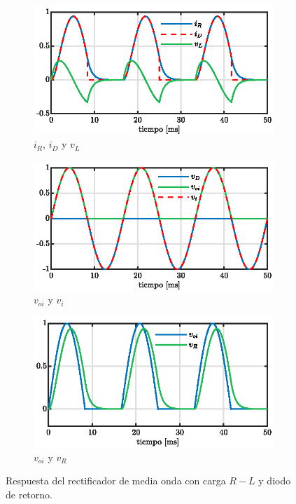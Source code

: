 \documentclass[conference]{IEEEtran}
\begin{document}
\begin{figure}[ht]
  \centering
  \begin{subfigure}[t]{0.5\textwidth}
    \centering
    \includegraphics[width=\linewidth]{figuras/ir_id_vl.eps}
    \caption{$i_R$, $i_D$ y $v_L$}
    \label{fig:ir-id-vl}
  \end{subfigure}\hfill
  \begin{subfigure}[t]{0.5\textwidth}
    \centering
    \includegraphics[width=\linewidth]{figuras/voi_vi.eps}
    \caption{$v_{oi}$ y $v_i$}
    \label{fig:voi-vi}
  \end{subfigure}\hfill
  \begin{subfigure}[t]{0.5\textwidth}
    \centering
    \includegraphics[width=\linewidth]{figuras/voi_vr.eps}
    \caption{$v_{oi}$ y $v_R$}
    \label{fig:voi-vr}
  \end{subfigure}
  \caption{Respuesta del rectificador de media onda con carga $R\!-\!L$ y diodo de retorno.}
  \label{fig:rectificador-subfigs}
\end{figure}
\end{document}
